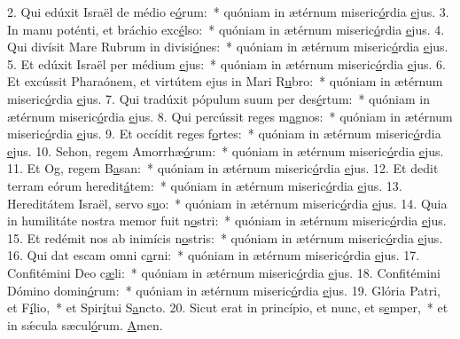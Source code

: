 2. Qui edúxit Israël de médio e\uline{ó}rum:~* quóniam in ætérnum miseric\uline{ó}rdia \uline{e}jus.
3. In manu poténti, et bráchio exc\uline{é}lso:~* quóniam in ætérnum miseric\uline{ó}rdia \uline{e}jus.
4. Qui divísit Mare Rubrum in divisi\uline{ó}nes:~* quóniam in ætérnum miseric\uline{ó}rdia \uline{e}jus.
5. Et edúxit Israël per médium \uline{e}jus:~* quóniam in ætérnum miseric\uline{ó}rdia \uline{e}jus.
6. Et excússit Pharaónem, et virtútem ejus in Mari R\uline{u}bro:~* quóniam in ætérnum miseric\uline{ó}rdia \uline{e}jus.
7. Qui tradúxit pópulum suum per des\uline{é}rtum:~* quóniam in ætérnum miseric\uline{ó}rdia \uline{e}jus.
8. Qui percússit reges m\uline{a}gnos:~* quóniam in ætérnum miseric\uline{ó}rdia \uline{e}jus.
9. Et occídit reges f\uline{o}rtes:~* quóniam in ætérnum miseric\uline{ó}rdia \uline{e}jus.
10. Sehon, regem Amorrhæ\uline{ó}rum:~* quóniam in ætérnum miseric\uline{ó}rdia \uline{e}jus.
11. Et Og, regem B\uline{a}san:~* quóniam in ætérnum miseric\uline{ó}rdia \uline{e}jus.
12. Et dedit terram eórum heredit\uline{á}tem:~* quóniam in ætérnum miseric\uline{ó}rdia \uline{e}jus.
13. Hereditátem Israël, servo s\uline{u}o:~* quóniam in ætérnum miseric\uline{ó}rdia \uline{e}jus.
14. Quia in humilitáte nostra memor fuit n\uline{o}stri:~* quóniam in ætérnum miseric\uline{ó}rdia \uline{e}jus.
15. Et redémit nos ab inimícis n\uline{o}stris:~* quóniam in ætérnum miseric\uline{ó}rdia \uline{e}jus.
16. Qui dat escam omni c\uline{a}rni:~* quóniam in ætérnum miseric\uline{ó}rdia \uline{e}jus.
17. Confitémini Deo c\uline{æ}li:~* quóniam in ætérnum miseric\uline{ó}rdia \uline{e}jus.
18. Confitémini Dómino domin\uline{ó}rum:~* quóniam in ætérnum miseric\uline{ó}rdia \uline{e}jus.
19. Glória Patri, et F\uline{í}lio,~* et Spir\uline{í}tui S\uline{a}ncto.
20. Sicut erat in princípio, et nunc, et s\uline{e}mper,~* et in sǽcula sæcul\uline{ó}rum. \uline{A}men.
